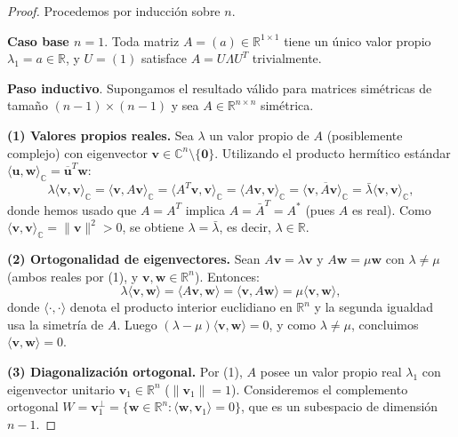 \begin{proof}
	Procedemos por inducción sobre $n$.

	\textbf{Caso base $n = 1$}. Toda matriz $A = (a) \in \mathbb{R}^{1 \times 1}$ tiene un único valor propio $\lambda_1 = a \in \mathbb{R}$, y $U = (1)$ satisface $A = U \Lambda U^T$ trivialmente.

	\textbf{Paso inductivo}. Supongamos el resultado válido para matrices simétricas de tamaño $(n-1) \times (n-1)$ y sea $A \in \mathbb{R}^{n \times n}$ simétrica.

	\textbf{(1) Valores propios reales.} Sea $\lambda$ un valor propio de $A$ (posiblemente complejo) con eigenvector $\mathbf{v} \in \mathbb{C}^n \setminus \{\mathbf{0}\}$. Utilizando el producto hermítico estándar $\langle \mathbf{u}, \mathbf{w} \rangle_{\mathbb{C}} = \overline{\mathbf{u}}^T \mathbf{w}$:
	\[
		\lambda \langle \mathbf{v}, \mathbf{v} \rangle_{\mathbb{C}} = \langle \mathbf{v}, A\mathbf{v} \rangle_{\mathbb{C}} = \langle A^T \mathbf{v}, \mathbf{v} \rangle_{\mathbb{C}} = \langle A\mathbf{v}, \mathbf{v} \rangle_{\mathbb{C}} = \overline{\langle \mathbf{v}, A\mathbf{v} \rangle_{\mathbb{C}}} = \bar{\lambda} \langle \mathbf{v}, \mathbf{v} \rangle_{\mathbb{C}},
	\]
	donde hemos usado que $A = A^T$ implica $A = \bar{A}^T = A^*$ (pues $A$ es real). Como $\langle \mathbf{v}, \mathbf{v} \rangle_{\mathbb{C}} = \|\mathbf{v}\|^2 > 0$, se obtiene $\lambda = \bar{\lambda}$, es decir, $\lambda \in \mathbb{R}$.

	\textbf{(2) Ortogonalidad de eigenvectores.} Sean $A\mathbf{v} = \lambda \mathbf{v}$ y $A\mathbf{w} = \mu \mathbf{w}$ con $\lambda \neq \mu$ (ambos reales por (1), y $\mathbf{v}, \mathbf{w} \in \mathbb{R}^n$). Entonces:
	\[
		\lambda \langle \mathbf{v}, \mathbf{w} \rangle = \langle A\mathbf{v}, \mathbf{w} \rangle = \langle \mathbf{v}, A\mathbf{w} \rangle = \mu \langle \mathbf{v}, \mathbf{w} \rangle,
	\]
	donde $\langle \cdot, \cdot \rangle$ denota el producto interior euclidiano en $\mathbb{R}^n$ y la segunda igualdad usa la simetría de $A$. Luego $(\lambda - \mu)\langle \mathbf{v}, \mathbf{w} \rangle = 0$, y como $\lambda \neq \mu$, concluimos $\langle \mathbf{v}, \mathbf{w} \rangle = 0$.

	\textbf{(3) Diagonalización ortogonal.} Por (1), $A$ posee un valor propio real $\lambda_1$ con eigenvector unitario $\mathbf{v}_1 \in \mathbb{R}^n$ ($\|\mathbf{v}_1\| = 1$). Consideremos el complemento ortogonal $W = \mathbf{v}_1^\perp = \{\mathbf{w} \in \mathbb{R}^n : \langle \mathbf{w}, \mathbf{v}_1 \rangle = 0\}$, que es un subespacio de dimensión $n - 1$.


\end{proof}
